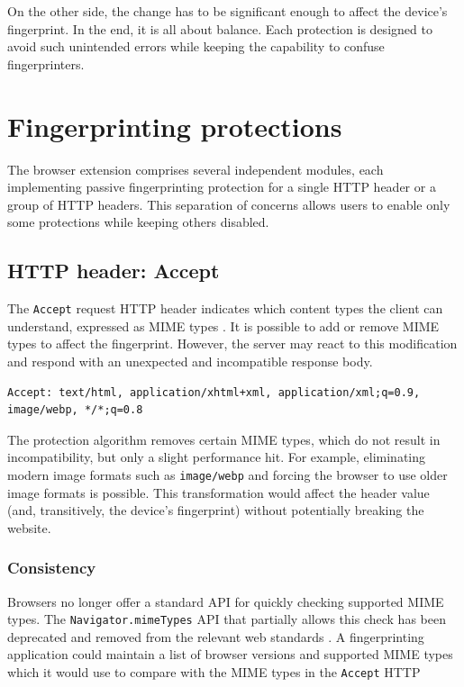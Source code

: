 On the other side, the change has to be significant enough to affect the device's fingerprint. In the end, it is all about balance. Each protection is designed to avoid such unintended errors while keeping the capability to confuse fingerprinters.

\section{Fingerprinting protections}

The browser extension comprises several independent modules, each implementing passive fingerprinting protection for a single HTTP header or a group of HTTP headers. This separation of concerns allows users to enable only some protections while keeping others disabled.

\subsection{HTTP header: Accept}
\label{SectionHTTPHeaderAccept}

The \texttt{Accept} request HTTP header indicates which content types the client can understand, expressed as MIME types \cite{MDN}. It is possible to add or remove MIME types to affect the fingerprint. However, the server may react to this modification and respond with an unexpected and incompatible response body.

\bigbreak

\begin{lstlisting}[caption={An example of Accept header contents \cite{MDN}.}]
Accept: text/html, application/xhtml+xml, application/xml;q=0.9, image/webp, */*;q=0.8
\end{lstlisting}

\medbreak

The protection algorithm removes certain MIME types, which do not result in incompatibility, but only a slight performance hit. For example, eliminating modern image formats such as \texttt{image/webp} and forcing the browser to use older image formats is possible. This transformation would affect the header value (and, transitively, the device's fingerprint) without potentially breaking the website.

\subsubsection{Consistency}

Browsers no longer offer a standard API for quickly checking supported MIME types. The \texttt{Navigator.mimeTypes} API that partially allows this check has been deprecated and removed from the relevant web standards \cite{MDNNavigatorInterface}. A fingerprinting application could maintain a list of browser versions and supported MIME types which it would use to compare with the MIME types in the \texttt{Accept} HTTP 

